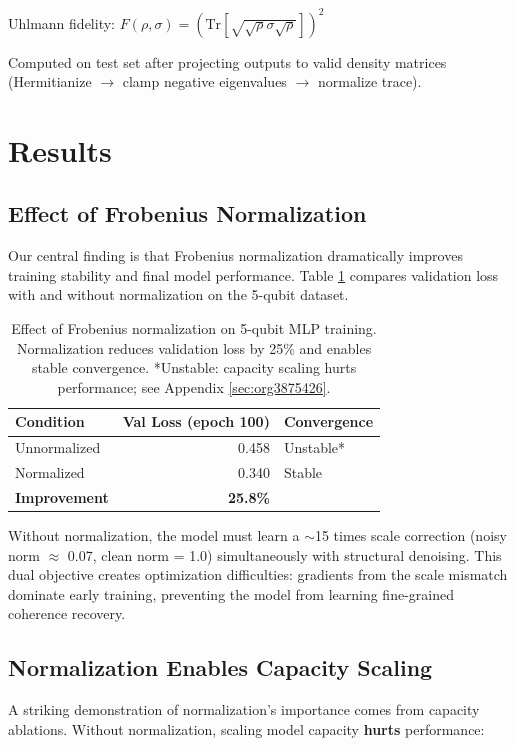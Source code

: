 \documentclass[11pt]{article}
\begin{document}
Uhlmann fidelity: \(F(\rho, \sigma) = (\mathrm{Tr}[\sqrt{\sqrt{\rho}\sigma\sqrt{\rho}}])^2\)

Computed on test set after projecting outputs to valid density matrices (Hermitianize \(\to\) clamp negative eigenvalues \(\to\) normalize trace).
\section{Results}
\label{sec:org9812d11}

\subsection{Effect of Frobenius Normalization}
\label{sec:orgef7e911}

Our central finding is that Frobenius normalization dramatically improves training stability and final model performance. Table \ref{tab:orgf3e98cd} compares validation loss with and without normalization on the 5-qubit dataset.

\begin{table}[htbp]
\caption{\label{tab:orgf3e98cd}Effect of Frobenius normalization on 5-qubit MLP training. Normalization reduces validation loss by 25\% and enables stable convergence. *Unstable: capacity scaling hurts performance; see Appendix \ref{sec:org3875426}.}
\centering
\begin{tabular}{lrl}
Condition & Val Loss (epoch 100) & Convergence\\
\hline
Unnormalized & 0.458 & Unstable*\\
Normalized & 0.340 & Stable\\
\textbf{Improvement} & \textbf{25.8\%} & \\
\end{tabular}
\end{table}

Without normalization, the model must learn a \(\sim\)15 times scale correction (noisy norm \(\approx\) 0.07, clean norm = 1.0) simultaneously with structural denoising. This dual objective creates optimization difficulties: gradients from the scale mismatch dominate early training, preventing the model from learning fine-grained coherence recovery.
\subsection{Normalization Enables Capacity Scaling}
\label{sec:org97ddb42}

A striking demonstration of normalization's importance comes from capacity ablations. Without normalization, scaling model capacity \textbf{hurts} performance:
\end{document}
